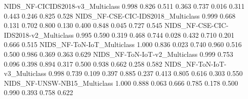 NIDS_NF-CICIDS2018-v3_Multiclass                                           0.998            0.826                                    0.511                           0.363           0.737                    0.016                                                     0.311                                     0.443                                     0.246                              0.825   0.528
NIDS_NF-CSE-CIC-IDS2018_Multiclass                                         0.999            0.668                                    0.131                           0.702           0.800                    0.130                                                     0.400                                     0.848                                     0.045                              0.727   0.545
NIDS_NF-CSE-CIC-IDS2018-v2_Multiclass                                      0.995            0.590                                    0.319                           0.468           0.744                    0.028                                                     0.432                                     0.710                                     0.201                              0.666   0.515
NIDS_NF-ToN-IoT_Multiclass                                                 1.000            0.836                                    0.023                           0.740           0.960                    0.516                                                     0.500                                     0.986                                     0.369                              0.363   0.629
NIDS_NF-ToN-IoT-v2_Multiclass                                              0.999            0.753                                    0.096                           0.398           0.894                    0.317                                                     0.500                                     0.938                                     0.662                              0.258   0.582
NIDS_NF-ToN-IoT-v3_Multiclass                                              0.998            0.739                                    0.109                           0.397           0.885                    0.237                                                     0.413                                     0.805                                     0.616                              0.303   0.550
NIDS_NF-UNSW-NB15_Multiclass                                               1.000            0.888                                    0.063                           0.666           0.785                    0.178                                                     0.500                                     0.990                                     0.393                              0.758   0.622
